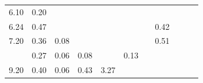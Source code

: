 \documentclass[10pt,a4paper]{article}
\begin{document}
\begin{table}
\begin{tabular}{@{}ccccccccccc@{}}
		6.10                                                         & 0.20                                                &                                                     &                                                     &                                                     &                                                      &                                                     &                                                       &                                                         &                                                      & \cite{Gell}                                \\
		6.24                                                         & 0.47                                                &                                                     &                                                     &                                                     &                                                      &                                                     & 0.42                                                  &                                                         &                                                      & \cite{Moset}                                \\
		7.20                                                         & 0.36                                                & 0.08                                                &                                                     &                                                     &                                                      &                                                     & 0.51                                                  &                                                         &                                                      & \cite{Ledda}                                \\
		& 0.27                                                & 0.06                                                & 0.08                                                &                                                     & 0.13                                                 &                                                     &                                                       &                                                         &                                                      & \cite{Kirchmann} \\
		9.20                                                         & 0.40                                                & 0.06                                                & 0.43                                                & 3.27                                                &                                                      &                                                     &                                                       &                                                         &                                                      & \cite{Moller2}        \\

\end{tabular}
\end{table}
\end{document}
